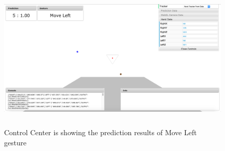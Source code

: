 \begin{figure}
	[h] \centering 
	\includegraphics[height=70mm]{figures/result/cc-move-left.png} \caption{Control Center is showing the prediction results of Move Left gesture}
	\label{res:cc:move:left}	 
\end{figure}

